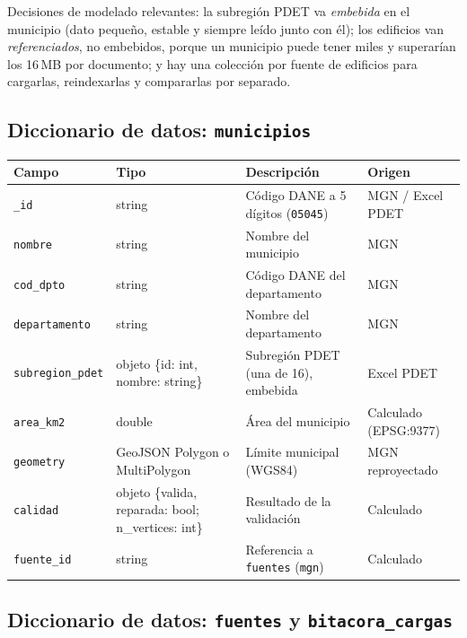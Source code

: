 \documentclass[11pt,a4paper]{article}
\newcommand{\campo}[1]{\texttt{#1}}
\begin{document}
Decisiones de modelado relevantes: la subregión PDET va \emph{embebida} en el
municipio (dato pequeño, estable y siempre leído junto con él); los edificios
van \emph{referenciados}, no embebidos, porque un municipio puede tener miles
y superarían los 16\,MB por documento; y hay una colección por fuente de
edificios para cargarlas, reindexarlas y compararlas por separado.

\subsection{Diccionario de datos: \texorpdfstring{\campo{municipios}}{municipios}}

\begin{table}[H]
\centering\small
\begin{tabularx}{\textwidth}{@{}p{3cm}p{3.6cm}Lp{2.6cm}@{}}
\toprule
\textbf{Campo} & \textbf{Tipo} & \textbf{Descripción} & \textbf{Origen} \\
\midrule
\campo{\_id} & string & Código DANE a 5 dígitos (\campo{05045}) & MGN / Excel PDET \\
\campo{nombre} & string & Nombre del municipio & MGN \\
\campo{cod\_dpto} & string & Código DANE del departamento & MGN \\
\campo{departamento} & string & Nombre del departamento & MGN \\
\campo{subregion\_pdet} & objeto \{id: int, nombre: string\} & Subregión PDET (una de 16), embebida & Excel PDET \\
\campo{area\_km2} & double & Área del municipio & Calculado (EPSG:9377) \\
\campo{geometry} & GeoJSON Polygon o MultiPolygon & Límite municipal (WGS84) & MGN reproyectado \\
\campo{calidad} & objeto \{valida, reparada: bool; n\_vertices: int\} & Resultado de la validación & Calculado \\
\campo{fuente\_id} & string & Referencia a \campo{fuentes} (\campo{mgn}) & Calculado \\
\bottomrule
\end{tabularx}
\end{table}

\subsection{Diccionario de datos: \texorpdfstring{\campo{fuentes}}{fuentes} y \texorpdfstring{\campo{bitacora\_cargas}}{bitacora\_cargas}}
\end{document}
